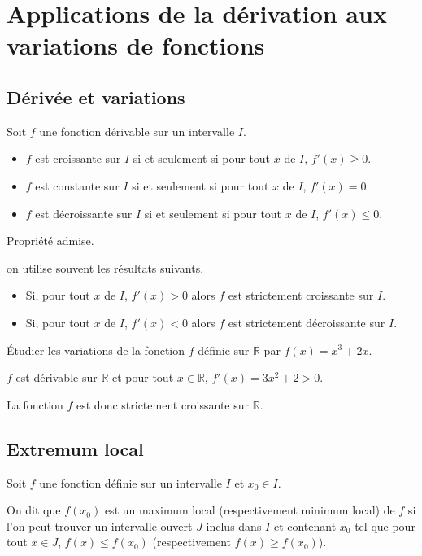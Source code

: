\documentclass[french]{book}
\newcommand{\R}{\mathbb {R}}
\newcommand{\se}{\geq}
\newcommand{\ie}{\leq}
\begin{document}
\section{Applications de la dérivation aux variations de fonctions}
\subsection{Dérivée et variations}
\begin{prop}
Soit $f$ une fonction dérivable sur un intervalle $I$.
\begin{itemize}
\item $f$ est croissante sur $I$ si et seulement si pour tout $x$ de $I$, $f'(x)\se 0$.
\item $f$ est constante sur $I$ si et seulement si pour tout $x$ de $I$, $f'(x)=0$.
\item $f$ est décroissante sur $I$ si et seulement si pour tout $x$ de $I$, $f'(x)\ie 0$.
\end{itemize}
\end{prop}

Propriété admise.

\begin{rem}
on utilise souvent les résultats suivants.
\begin{itemize}
\item Si, pour tout $x$ de $I$, $f'(x)>0$ alors $f$ est strictement croissante sur $I$.
\item Si, pour tout $x$ de $I$, $f'(x)<0$ alors $f$ est strictement décroissante sur $I$.
\end{itemize}
\end{rem}

\begin{exemple}
Étudier les variations de la fonction $f$ définie sur $\R$ par $f(x)=x^{3}+2x$.
\end{exemple}


$f$ est dérivable sur $\R$ et pour tout $x\in \R$, $f'(x)=3x^{2}+2>0$.

La fonction $f$ est donc strictement croissante sur $\R$.


\subsection{Extremum local}
\begin{prop}
Soit $f$ une fonction définie sur un intervalle $I$ et $x_{0}\in I$.

On dit que $f(x_{0})$ est un maximum local (respectivement minimum local) de $f$ si l'on peut trouver un intervalle ouvert $J$ inclus dans $I$ et contenant $x_{0}$ tel que pour tout $x\in J$, $f(x)\ie f(x_{0})$ (respectivement $f(x)\se f(x_{0})$).
\end{prop}
\end{document}

